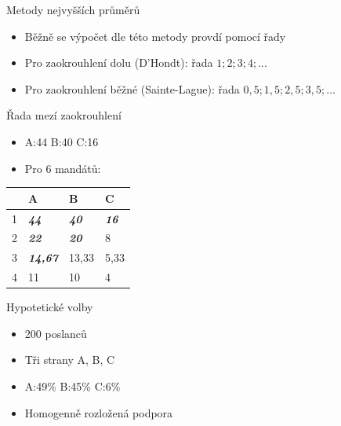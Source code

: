 \documentclass[17pt]{beamer}
\begin{document}

\begin{frame}{Metody nejvyšších průměrů}
\begin{itemize}
\item Běžně se výpočet dle této metody provdí pomocí řady 
\item Pro zaokrouhlení dolu (D'Hondt): řada $1; 2; 3; 4; ...$
\item Pro zaokrouhlení běžné (Sainte-Lague): řada $0{,}5; 1{,}5; 2{,}5; 3{,}5; ...$
\end{itemize}
\end{frame}

\begin{frame}{Řada mezí zaokrouhlení}
\begin{itemize}
\item A:44 B:40 C:16
\item Pro 6 mandátů:
\end{itemize}
\begin{center}
\begin{tabular}{|C{2cm}|C{2cm}|C{2cm}|C{2cm}|}
\hline 
 & A & B & C \\ 
 & \emph{\textbf{44}} & \emph{\textbf{40}} & \emph{\textbf{16}} \\ 
 & \emph{\textbf{22}} & \emph{\textbf{20}} & 8 \\ 
 & \emph{\textbf{14,67}} & 13,33 & 5,33 \\ 
 & 11 & 10 & 4 \\ 
\hline 
\end{tabular} 
\end{center}
\end{frame}

\begin{frame}{Hypotetické volby}
\begin{itemize}
\item 200 poslanců
\item Tři strany A, B, C
\item A:49\% B:45\% C:6\%
\item Homogenně rozložená podpora
\end{itemize}
\end{frame}
\end{document}
